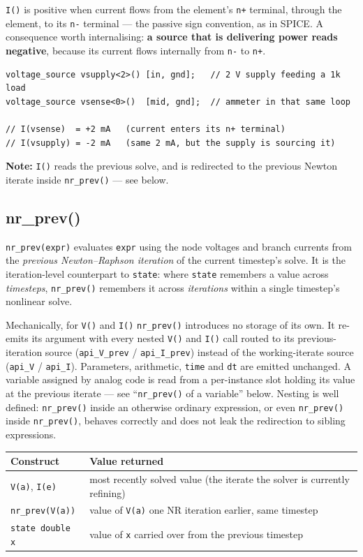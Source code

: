 \documentclass[11pt, a4paper]{article}
\newcommand{\code}[1]{\texttt{\small #1}}
\begin{document}
\code{I()} is positive when current flows from the element's \code{n+}
terminal, through the element, to its \code{n-} terminal --- the passive sign
convention, as in SPICE. A consequence worth internalising: \textbf{a source
that is delivering power reads negative}, because its current flows internally
from \code{n-} to \code{n+}.

\begin{lstlisting}
voltage_source vsupply<2>() [in, gnd];   // 2 V supply feeding a 1k load
voltage_source vsense<0>()  [mid, gnd];  // ammeter in that same loop

// I(vsense)  = +2 mA   (current enters its n+ terminal)
// I(vsupply) = -2 mA   (same 2 mA, but the supply is sourcing it)
\end{lstlisting}

\textbf{Note:} \code{I()} reads the previous solve, and is redirected to the
previous Newton iterate inside \code{nr\_prev()} --- see below.

\subsection{nr\_prev()}
\code{nr\_prev(expr)} evaluates \code{expr} using the node voltages and branch
currents from the \textit{previous Newton--Raphson iteration} of the current
timestep's solve. It is the iteration-level counterpart to \code{state}: where
\code{state} remembers a value across \textit{timesteps}, \code{nr\_prev()}
remembers it across \textit{iterations} within a single timestep's nonlinear
solve.

Mechanically, for \code{V()} and \code{I()} \code{nr\_prev()} introduces no
storage of its own. It re-emits its argument with every nested \code{V()} and
\code{I()} call routed to its previous-iteration source (\code{api\_V\_prev} /
\code{api\_I\_prev}) instead of the working-iterate source (\code{api\_V} /
\code{api\_I}). Parameters, arithmetic, \code{time} and \code{dt} are emitted
unchanged. A variable assigned by analog code is read from a per-instance slot
holding its value at the previous iterate --- see ``\code{nr\_prev()} of a
variable'' below. Nesting is well defined: \code{nr\_prev()} inside an otherwise
ordinary expression, or even \code{nr\_prev()} inside \code{nr\_prev()}, behaves
correctly and does not leak the redirection to sibling expressions.

\begin{center}
\begin{tabular}{@{} L{4.5cm} L{8.5cm} @{}}
\toprule
\textbf{Construct} & \textbf{Value returned} \\
\midrule
\code{V(a)}, \code{I(e)}        & most recently solved value (the iterate the solver is currently refining) \\
\code{nr\_prev(V(a))}           & value of \code{V(a)} one NR iteration earlier, same timestep \\
\code{state double x}           & value of \code{x} carried over from the previous timestep \\
\bottomrule
\end{tabular}
\end{center}
\end{document}
